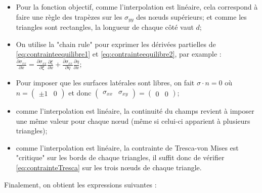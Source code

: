 \begin{itemize}
\item  Pour la fonction objectif, comme l'interpolation est linéaire, cela correspond à faire une règle des trapèzes sur les $\sigma_{yy}$ des nœuds supérieurs; et comme les triangles sont rectangles, la longueur de chaque côté vaut $d$;
\item  On utilise la "chain rule" pour exprimer les dérivées partielles de \eqref{eq:contrainteequilibre1} et \eqref{eq:contrainteequilibre2}, par example : $\frac{\partial \sigma_{xx}}{\partial x} = \frac{\partial \sigma_{xx}}{\partial \xi} \frac{\partial \xi}{\partial x} + \frac{\partial \sigma_{xx}}{\partial \eta} \frac{\partial \eta}{\partial x}$;
\item Pour imposer que les surfaces latérales sont libres, on fait $\sigma \cdot n = 0 $ où 
$n=\begin{pmatrix}
± 1 & 0
\end{pmatrix}$ et donc $\begin{pmatrix}
\sigma_{xx} & \sigma_{xy}
\end{pmatrix} = \begin{pmatrix}
0 &0
\end{pmatrix}$;
\item comme l'interpolation est linéaire, la continuité du champs revient à imposer une même valeur pour chaque nœud (même si celui-ci apparient à plusieurs triangles);
\item comme l'interpolation est linéaire, la contrainte de Tresca-von Mises est "critique" sur les bords de chaque triangles, il suffit donc de vérifier \eqref{eq:contrainteTresca} sur les trois nœuds de chaque triangle. 
\end{itemize}
Finalement, on obtient les expressions suivantes : 

